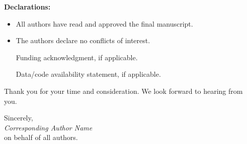 \documentclass[11pt]{article}
\begin{document}
\vspace{6pt}

\noindent
\textbf{Declarations:}
\begin{itemize}
    \item All authors have read and approved the final manuscript.
    \item The authors declare no conflicts of interest.
    \item [Funding acknowledgment, if applicable.]
    \item [Data/code availability statement, if applicable.]
\end{itemize}

\vspace{6pt}



\vspace{18pt}

\noindent
Thank you for your time and consideration. We look forward to
hearing from you.

\vspace{12pt}

\noindent
Sincerely,\\[24pt]
\noindent
\textit{Corresponding Author Name}\\
on behalf of all authors.
\end{document}
